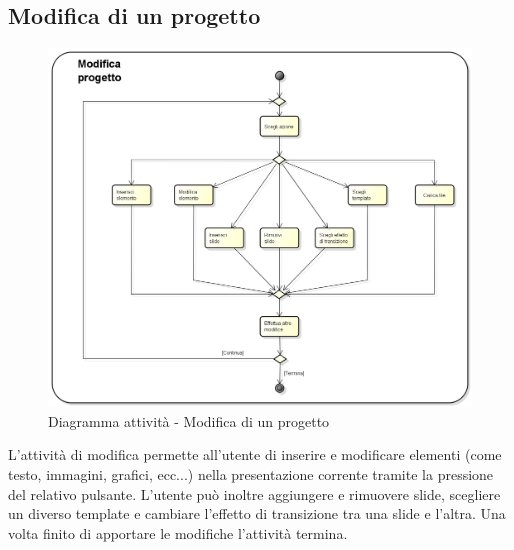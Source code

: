\subsection{Modifica di un progetto}
\begin{figure}[h] 
	\centering 
	\includegraphics[width=0.9\linewidth] {img/activity_modifica.png}
	\caption{Diagramma attività - Modifica di un progetto} 
\end{figure}
L'attività di modifica permette all'utente di inserire e modificare elementi (come testo, immagini, grafici, ecc...)  nella presentazione corrente tramite la pressione del relativo pulsante. L'utente può inoltre aggiungere e rimuovere \gls{slide}, scegliere un diverso \gls{template} e cambiare l'effetto di transizione tra una \gls{slide} e l'altra. Una volta finito di apportare le modifiche l'attività termina.
\newpage

